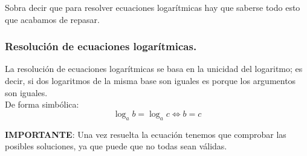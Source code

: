 \documentclass[a4paper,11pt,answers]{exam}
\begin{document}
Sobra decir que para resolver ecuaciones logarítmicas hay que saberse todo esto que acabamos de
repasar.

\subsubsection{Resolución de ecuaciones logarítmicas.}
La resolución de ecuaciones logarítmicas se basa en la unicidad del logaritmo; es decir, si dos
logaritmos de la misma base son iguales es porque los argumentos son iguales.\\
De forma simbólica:
\[\log_a b = \log_a c \Leftrightarrow b = c\]

\textbf{IMPORTANTE}: Una vez resuelta la ecuación tenemos que comprobar las posibles soluciones, ya que puede que no todas sean válidas.\\
\end{document}
